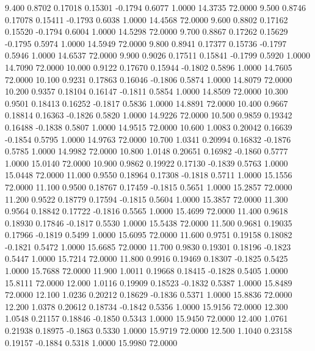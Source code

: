    9.400   0.8702   0.17018   0.15301  -0.1794   0.6077   1.0000  14.3735  72.0000
   9.500   0.8746   0.17078   0.15411  -0.1793   0.6038   1.0000  14.4568  72.0000
   9.600   0.8802   0.17162   0.15520  -0.1794   0.6004   1.0000  14.5298  72.0000
   9.700   0.8867   0.17262   0.15629  -0.1795   0.5974   1.0000  14.5949  72.0000
   9.800   0.8941   0.17377   0.15736  -0.1797   0.5946   1.0000  14.6537  72.0000
   9.900   0.9026   0.17511   0.15841  -0.1799   0.5920   1.0000  14.7090  72.0000
  10.000   0.9122   0.17670   0.15944  -0.1802   0.5896   1.0000  14.7605  72.0000
  10.100   0.9231   0.17863   0.16046  -0.1806   0.5874   1.0000  14.8079  72.0000
  10.200   0.9357   0.18104   0.16147  -0.1811   0.5854   1.0000  14.8509  72.0000
  10.300   0.9501   0.18413   0.16252  -0.1817   0.5836   1.0000  14.8891  72.0000
  10.400   0.9667   0.18814   0.16363  -0.1826   0.5820   1.0000  14.9226  72.0000
  10.500   0.9859   0.19342   0.16488  -0.1838   0.5807   1.0000  14.9515  72.0000
  10.600   1.0083   0.20042   0.16639  -0.1854   0.5795   1.0000  14.9763  72.0000
  10.700   1.0341   0.20994   0.16832  -0.1876   0.5785   1.0000  14.9982  72.0000
  10.800   1.0148   0.20651   0.16982  -0.1860   0.5777   1.0000  15.0140  72.0000
  10.900   0.9862   0.19922   0.17130  -0.1839   0.5763   1.0000  15.0448  72.0000
  11.000   0.9550   0.18964   0.17308  -0.1818   0.5711   1.0000  15.1556  72.0000
  11.100   0.9500   0.18767   0.17459  -0.1815   0.5651   1.0000  15.2857  72.0000
  11.200   0.9522   0.18779   0.17594  -0.1815   0.5604   1.0000  15.3857  72.0000
  11.300   0.9564   0.18842   0.17722  -0.1816   0.5565   1.0000  15.4699  72.0000
  11.400   0.9618   0.18930   0.17846  -0.1817   0.5530   1.0000  15.5438  72.0000
  11.500   0.9681   0.19035   0.17966  -0.1819   0.5499   1.0000  15.6095  72.0000
  11.600   0.9751   0.19158   0.18082  -0.1821   0.5472   1.0000  15.6685  72.0000
  11.700   0.9830   0.19301   0.18196  -0.1823   0.5447   1.0000  15.7214  72.0000
  11.800   0.9916   0.19469   0.18307  -0.1825   0.5425   1.0000  15.7688  72.0000
  11.900   1.0011   0.19668   0.18415  -0.1828   0.5405   1.0000  15.8111  72.0000
  12.000   1.0116   0.19909   0.18523  -0.1832   0.5387   1.0000  15.8489  72.0000
  12.100   1.0236   0.20212   0.18629  -0.1836   0.5371   1.0000  15.8836  72.0000
  12.200   1.0378   0.20612   0.18734  -0.1842   0.5356   1.0000  15.9156  72.0000
  12.300   1.0548   0.21157   0.18846  -0.1850   0.5343   1.0000  15.9450  72.0000
  12.400   1.0761   0.21938   0.18975  -0.1863   0.5330   1.0000  15.9719  72.0000
  12.500   1.1040   0.23158   0.19157  -0.1884   0.5318   1.0000  15.9980  72.0000
